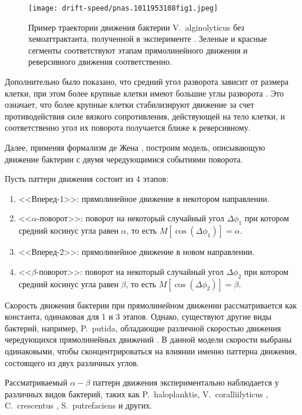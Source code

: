 \begin{figure}[ht]
    \centering
    \texttt{[image: drift-speed/pnas.1011953108fig1.jpeg]}
    \caption{
        Пример траектории движения бактерии V.~alginolyticus без хемоаттрактанта, полученной в эксперименте
        \cite{xie_bacterial_2011}. Зеленые и красные сегменты соответствуют этапам прямолинейного движения и реверсивного движения соответственно.
    }
    \label{fig:vibrio-trajectories}
\end{figure}

Дополнительно было показано, что средний угол разворота зависит от размера клетки, при этом более крупные клетки имеют большие углы разворота \cite{taute_high-throughput_2015}. Это означает, что более крупные клетки стабилизируют движение за счет противодействия силе вязкого сопротивления, действующей на тело клетки, и соответственно угол их поворота получается ближе к реверсивному. 

Далее, применяя формализм де Жена \cite{de_gennes_chemotaxis_2004}, построим модель, описывающую движение бактерии с двумя чередующимися событиями поворота.

Пусть паттерн движения состоит из 4 этапов: 
\begin{enumerate}
  \item <<Вперед-1>>: прямолинейное движение в некотором направлении.
  \item <<$\alpha$-поворот>>: поворот на некоторый случайный угол $\Delta\phi_1$ при котором средний косинус угла равен $\alpha$, то есть $M[\cos (\Delta\phi_1)]=\alpha$.
  \item <<Вперед-2>>: прямолинейное движение в новом направлении.
  \item <<$\beta$-поворот>>: поворот на некоторый случайный угол $\Delta\phi_2$ при котором средний косинус угла равен $\beta$, то есть $M[\cos (\Delta\phi_2)]=\beta$.
\end{enumerate}

Скорость движения бактерии при прямолинейном движении рассматривается как константа, одинаковая для 1 и 3 этапов. Однако, существуют другие виды бактерий, например, P.~putida, обладающие различной скоростью движения чередующихся прямолинейных движений \cite{theves_bacterial_2013}. В данной модели скорости выбраны одинаковыми, чтобы сконцентрироваться на влиянии именно паттерна движения, состоящего из двух различных углов.

Рассматриваемый $\alpha-\beta$ паттерн движения экспериментально наблюдается у различных видов бактерий, таких как P.~haloplanktis, V.~coralliilyticus \cite{son_bacteria_2013}, C.~crescentus \cite{liu_helical_2014}, S.~putrefaciens \cite{stocker_reverse_2011} и других. 

